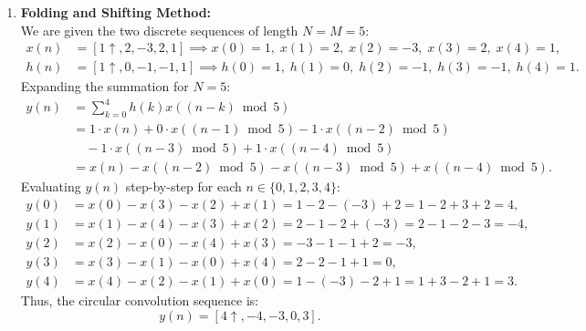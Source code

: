 \documentclass[12pt,a4paper]{article}
\begin{document}
\begin{enumerate}
    \item \textbf{Folding and Shifting Method:}\\[0.5ex]
    We are given the two discrete sequences of length $N = M = 5$:
    \begin{align*}
        x(n) &= [1 \uparrow, 2, -3, 2, 1] \implies x(0)=1, \; x(1)=2, \; x(2)=-3, \; x(3)=2, \; x(4)=1, \\
        h(n) &= [1 \uparrow, 0, -1, -1, 1] \implies h(0)=1, \; h(1)=0, \; h(2)=-1, \; h(3)=-1, \; h(4)=1.
    \end{align*}
    Expanding the summation for $N = 5$:
    \begin{align*}
        y(n) &= \sum_{k=0}^{4} h(k) x((n - k) \bmod 5) \\
        &= 1 \cdot x(n) + 0 \cdot x((n-1)\bmod 5) - 1 \cdot x((n-2)\bmod 5) \\
        &\quad - 1 \cdot x((n-3)\bmod 5) + 1 \cdot x((n-4)\bmod 5) \\
        &= x(n) - x((n-2)\bmod 5) - x((n-3)\bmod 5) + x((n-4)\bmod 5).
    \end{align*}
    Evaluating $y(n)$ step-by-step for each $n \in \{0, 1, 2, 3, 4\}$:
    \begin{align*}
        y(0) &= x(0) - x(3) - x(2) + x(1) = 1 - 2 - (-3) + 2 = 1 - 2 + 3 + 2 = 4, \\
        y(1) &= x(1) - x(4) - x(3) + x(2) = 2 - 1 - 2 + (-3) = 2 - 1 - 2 - 3 = -4, \\
        y(2) &= x(2) - x(0) - x(4) + x(3) = -3 - 1 - 1 + 2 = -3, \\
        y(3) &= x(3) - x(1) - x(0) + x(4) = 2 - 2 - 1 + 1 = 0, \\
        y(4) &= x(4) - x(2) - x(1) + x(0) = 1 - (-3) - 2 + 1 = 1 + 3 - 2 + 1 = 3.
    \end{align*}
    Thus, the circular convolution sequence is:
    \begin{equation}
        y(n) = [4 \uparrow, -4, -3, 0, 3].
        \label{eq:ex7_result}
    \end{equation}


\end{enumerate}
\end{document}
